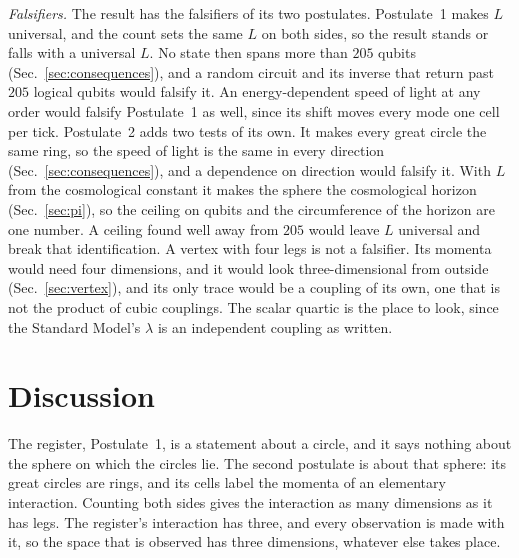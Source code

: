 \documentclass[aps,prd,twocolumn,superscriptaddress,nofootinbib]{revtex4-2}
\begin{document}
\textit{Falsifiers.} The result has the falsifiers of its two postulates. Postulate~1 makes $L$ universal, and the count sets the same $L$ on both sides, so the result stands or falls with a universal $L$. No state then spans more than $205$ qubits (Sec.~\ref{sec:consequences}), and a random circuit and its inverse that return past $205$ logical qubits would falsify it. An energy-dependent speed of light at any order would falsify Postulate~1 as well, since its shift moves every mode one cell per tick. Postulate~2 adds two tests of its own. It makes every great circle the same ring, so the speed of light is the same in every direction (Sec.~\ref{sec:consequences}), and a dependence on direction would falsify it. With $L$ from the cosmological constant it makes the sphere the cosmological horizon (Sec.~\ref{sec:pi}), so the ceiling on qubits and the circumference of the horizon are one number. A ceiling found well away from $205$ would leave $L$ universal and break that identification. A vertex with four legs is not a falsifier. Its momenta would need four dimensions, and it would look three-dimensional from outside (Sec.~\ref{sec:vertex}), and its only trace would be a coupling of its own, one that is not the product of cubic couplings. The scalar quartic is the place to look, since the Standard Model's $\lambda$ is an independent coupling as written.

\section{Discussion}
\label{sec:discussion}

The register, Postulate~1, is a statement about a circle, and it says nothing about the sphere on which the circles lie. The second postulate is about that sphere: its great circles are rings, and its cells label the momenta of an elementary interaction. Counting both sides gives the interaction as many dimensions as it has legs. The register's interaction has three, and every observation is made with it, so the space that is observed has three dimensions, whatever else takes place.
\end{document}
